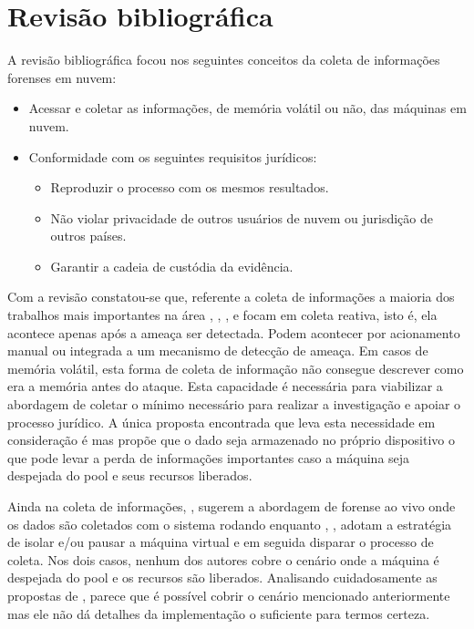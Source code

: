 \documentclass[12pt,				%
	openright,			%
	oneside,			%
	a4paper,			%
	english,			%
	brazil				%
	]{abntex2}
\begin{document}
\chapter{Revisão bibliográfica} \label{chap:related}
A revisão bibliográfica focou nos seguintes conceitos da coleta de informações forenses em nuvem:

\begin{itemize}
 \item Acessar e coletar as informações, de memória volátil ou não, das máquinas em nuvem.
 \item Conformidade com os seguintes requisitos jurídicos: 
 \begin{itemize}
  \item Reproduzir o processo com os mesmos resultados.
  \item Não violar privacidade de outros usuários de nuvem ou jurisdição de outros países.
  \item Garantir a cadeia de custódia da evidência.
 \end{itemize}
\end{itemize}

Com a revisão constatou-se que, referente a coleta de informações a maioria dos trabalhos mais importantes na área \cite{Reichert2015}, \cite{Poisel2013}, \cite{Dykstra2013}, 
\cite{George2012} e \cite{Sang2013} focam em coleta reativa, isto é, ela acontece apenas após a ameaça ser detectada. Podem acontecer por acionamento manual ou integrada a um 
mecanismo de detecção de ameaça. Em casos de memória volátil, esta forma de coleta de informação não consegue descrever como era a memória antes do ataque. Esta capacidade é
necessária para viabilizar a abordagem de coletar o mínimo necessário para realizar a investigação e apoiar o processo jurídico. A única proposta encontrada que leva esta 
necessidade em consideração é \cite{Dezfouli2012} mas propõe que o dado seja armazenado no próprio dispositivo o que pode levar a perda de informações importantes caso a 
máquina seja despejada do pool e seus recursos liberados.

Ainda na coleta de informações, \cite{Reichert2015}, \cite{George2012} sugerem a abordagem de forense ao vivo onde os dados são coletados com o sistema rodando enquanto 
\cite{Poisel2013}, \cite{Dykstra2013}, \cite{Sang2013} adotam a estratégia de isolar e/ou pausar a máquina virtual e em seguida disparar o processo de coleta. Nos dois casos, 
nenhum dos autores cobre o cenário onde a máquina é despejada do pool e os recursos são liberados. Analisando cuidadosamente as propostas de \cite{Poisel2013}, parece que é possível
cobrir o cenário mencionado anteriormente mas ele não dá detalhes da implementação o suficiente para termos certeza.
\end{document}
